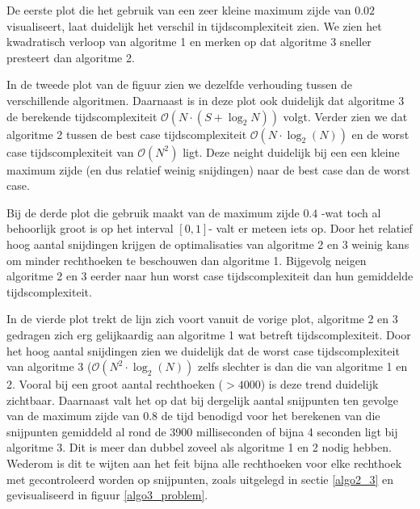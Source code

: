 \documentclass{article}
\begin{document}
De eerste plot die het gebruik van  een zeer kleine maximum zijde van $0.02$ visualiseert, laat duidelijk het verschil in tijdscomplexiteit zien. We zien het kwadratisch verloop van algoritme 1 en merken op dat algoritme 3 sneller presteert dan algoritme 2.

In de tweede plot van de figuur zien we dezelfde verhouding tussen de verschillende algoritmen. Daarnaast is in deze plot ook duidelijk dat algoritme 3 de berekende tijdscomplexiteit $\mathcal{O}(N\cdot(S+\log_2 N))$ volgt. Verder zien we dat algoritme 2 tussen de best case tijdscomplexiteit $\mathcal{O}(N\cdot\log_2(N))$ en de worst case tijdscomplexiteit van $\mathcal{O}(N^2)$ ligt. Deze neight duidelijk bij een een kleine maximum zijde (en dus relatief weinig snijdingen) naar de best case dan de worst case.

Bij de derde plot die gebruik maakt van de maximum zijde $0.4$ -wat toch al behoorlijk groot is op het interval $[0,1]$- valt er meteen iets op. Door het relatief hoog aantal snijdingen krijgen de optimalisaties van algoritme 2 en 3 weinig kans om minder rechthoeken te beschouwen dan algoritme 1. Bijgevolg neigen algoritme 2 en 3 eerder naar hun worst case tijdscomplexiteit dan hun gemiddelde tijdscomplexiteit.

In de vierde plot trekt de lijn zich voort vanuit de vorige plot, algoritme 2 en 3 gedragen zich erg gelijkaardig aan algoritme 1 wat betreft tijdscomplexiteit. Door het hoog aantal snijdingen zien we duidelijk dat de worst case tijdscomplexiteit van algoritme 3 ($\mathcal{O}(N^2\cdot\log_2(N))$ zelfs slechter is dan die van algoritme 1 en 2. Vooral bij een groot aantal rechthoeken ($>4000$) is deze trend duidelijk zichtbaar. Daarnaast valt het op dat bij dergelijk aantal snijpunten ten gevolge van de maximum zijde van $0.8$ de tijd benodigd voor het berekenen van die snijpunten gemiddeld al rond de 3900 milliseconden of bijna 4 seconden ligt bij algoritme 3. Dit is meer dan dubbel zoveel als algoritme 1 en 2 nodig hebben. Wederom is dit te wijten aan het feit bijna alle rechthoeken voor elke rechthoek met gecontroleerd worden op snijpunten, zoals uitgelegd in sectie \ref{algo2_3} en gevisualiseerd in figuur \ref{algo3_problem}.

\newpage
\end{document}
